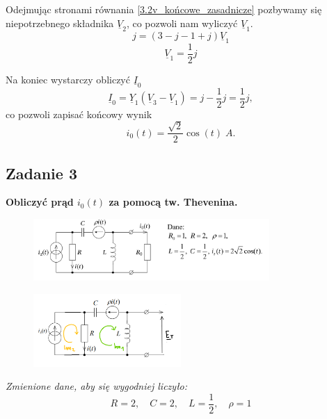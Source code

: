 \documentclass[12pt, a4paper]{article}
\begin{document}
Odejmując stronami równania \ref{3.2v_końcowe_zasadnicze} pozbywamy się
niepotrzebnego składnika $\underline{V}_2$, co pozwoli nam wyliczyć $\underline{V}_1$.
\begin{equation*}
  j = (3-j-1+j)\underline{V}_1
\end{equation*}
\begin{equation*}
  \underline{V}_1 = \frac{1}{2}j
\end{equation*}

Na koniec wystarczy obliczyć $\underline{I}_0$
\begin{equation*}
  \underline{I}_0 = \underline{Y}_1(\underline{V}_3-\underline{V}_1) =
  j - \frac{1}{2}j = \frac{1}{2}j,
\end{equation*}
co pozwoli zapisać końcowy wynik
\begin{equation*}
  i_0(t) = \frac{\sqrt{2}}{2}\cos(t)\; A.
\end{equation*}

\subsection{Zadanie 3}
\textbf{Obliczyć prąd $i_0(t)$ za pomocą tw. Thevenina.}
\begin{figure}[H]
  \includegraphics[width = 0.8\textwidth]{./images/Lista_3/Zadanie_3.png}
\end{figure}

\begin{figure}[H]
  \centering
  \includegraphics[width = 0.5\textwidth]{./images/Lista_3/3.3.1.png}
\end{figure}
\noindent
\textit{Zmienione dane, aby się wygodniej liczyło:}
\begin{equation*}
  R = 2, \quad C = 2, \quad L = \frac{1}{2}, \quad \rho = 1
\end{equation*}
\end{document}
